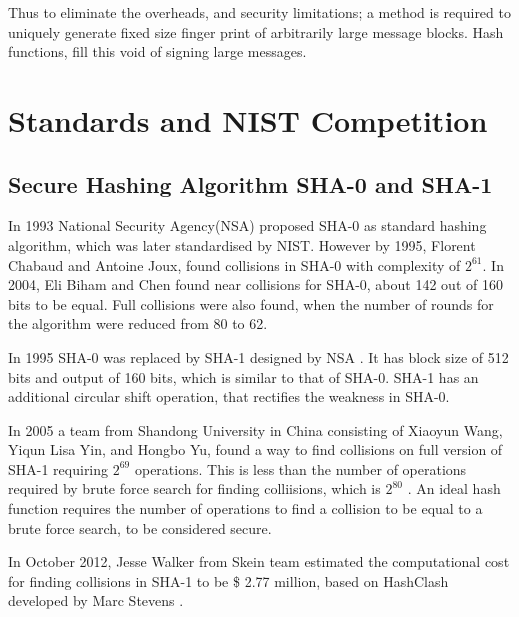 Thus to eliminate the overheads, and security limitations; a method is required to uniquely generate fixed
size finger print of arbitrarily large message blocks. Hash functions, fill this void of signing large messages.

\section{Standards and NIST Competition} 

  \subsection{Secure Hashing Algorithm SHA-0 and SHA-1}

  In 1993 National Security Agency(NSA) proposed SHA-0 as standard hashing algorithm, which was later
  standardised by NIST. However by 1995, Florent Chabaud and Antoine Joux, found collisions in SHA-0 
  with complexity of $2^{61}$. In 2004, Eli Biham and Chen found near collisions for SHA-0, about 142 
  out of 160 bits to be equal. Full  collisions were also found, when the number of rounds for the 
  algorithm were reduced from 80 to 62.

  In 1995 SHA-0 was replaced by SHA-1 designed by NSA \cite{00006, 00007}. It has block size of 512 bits
  and output of 160 bits, which is similar to that of SHA-0. SHA-1 has an additional circular shift operation, 
  that rectifies the weakness in SHA-0.

  In 2005 a team from Shandong University in China consisting of Xiaoyun Wang, Yiqun Lisa Yin, 
  and Hongbo Yu, found a way to find collisions on full version of SHA-1 requiring $2^{69}$ operations. 
  This is less than the number of operations required by brute force search for finding colliisions, which
  is $2^{80}$ \cite{00010}. An ideal hash function requires the number of operations to find a collision 
  to be equal to a brute force search, to be considered secure. 

  In October 2012, Jesse Walker from Skein team estimated the computational cost for finding collisions 
  in SHA-1 to be \$ 2.77 million, based on HashClash developed by Marc Stevens \cite{00008}.

